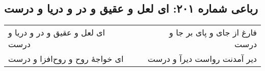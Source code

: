 \begin{center}
\section*{رباعی شماره ۲۰۱: ای لعل و عقیق و در و دریا و درست}
\label{sec:0201}
\begin{longtable}{l p{0.5cm} r}
ای لعل و عقیق و در و دریا و درست
&&
فارغ از جای و پای بر جا و درست
\\
ای خواجهٔ روح و روح‌افزا و درست
&&
دیر آمدنت رواست دیرآ و درست
\\
\end{longtable}
\end{center}
